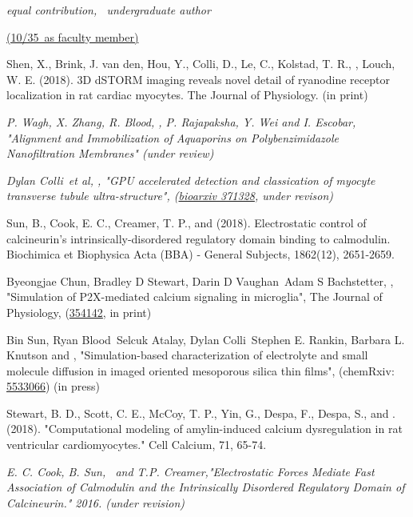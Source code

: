 \centerline{\sl * equal contribution,  \ug\ undergraduate author}
\vspace{10pt}
\newcommand\asfac{10}
\newcommand\total{35} %
\centerline{ \uline{(\asfac/\total\ as faculty member)}}
\begin{etaremune} \itemsep 2pt %
\item Shen, X., Brink, J. van den, Hou, Y., Colli, D., Le, C., Kolstad, T. R., \pmkh, Louch, W. E. (2018). 3D dSTORM imaging reveals novel detail of ryanodine receptor localization in rat cardiac myocytes. The Journal of Physiology. (in print)
\item \textit{P. Wagh, X. Zhang, R. Blood\ug, \pmkh, P. Rajapaksha, Y. Wei and I. Escobar, 
"Alignment and Immobilization of Aquaporins on Polybenzimidazole Nanofiltration Membranes" (under review)}
\item \textit{Dylan Colli\ug\ et al, \pmkh,
"GPU accelerated detection and classication of myocyte transverse tubule ultra-structure",
(\href{https://www.biorxiv.org/content/early/2018/07/17/371328}{bioarxiv 371328}, under revison)}
\item Sun, B., Cook, E. C., Creamer, T. P., and \pmkh (2018). Electrostatic control of calcineurin's intrinsically-disordered regulatory domain binding to calmodulin. Biochimica et Biophysica Acta (BBA) - General Subjects, 1862(12), 2651-2659. 
\item Byeongjae Chun, Bradley D Stewart, Darin D Vaughan\ug\, Adam S Bachstetter, \pmkh,
"Simulation of P2X-mediated calcium signaling in microglia", 
The Journal of Physiology, 
(\href{https://www.biorxiv.org/content/early/2018/06/24/354142}{354142}, in print)
\item Bin Sun, Ryan Blood\ug\, Selcuk Atalay, Dylan Colli\ug\, Stephen E. Rankin, Barbara L. Knutson and \pmkh, "Simulation-based characterization of electrolyte and small molecule diffusion in imaged oriented mesoporous silica thin films", 
(chemRxiv: \href{https://doi.org/10.26434/chemrxiv.5533066.v1}{5533066}) (in press)
\item Stewart, B. D., Scott, C. E., McCoy, T. P., Yin, G., Despa, F., Despa, S., and \pmkh. (2018). "Computational modeling of amylin-induced calcium dysregulation in rat ventricular cardiomyocytes." Cell Calcium, 71, 65-74. 
\item \textit{E. C. Cook, B. Sun, \pmkh\ and T.P. Creamer,"Electrostatic Forces Mediate Fast Association of Calmodulin and the Intrinsically Disordered Regulatory Domain of Calcineurin." 2016.  (under revision)}

\end{etaremune}
